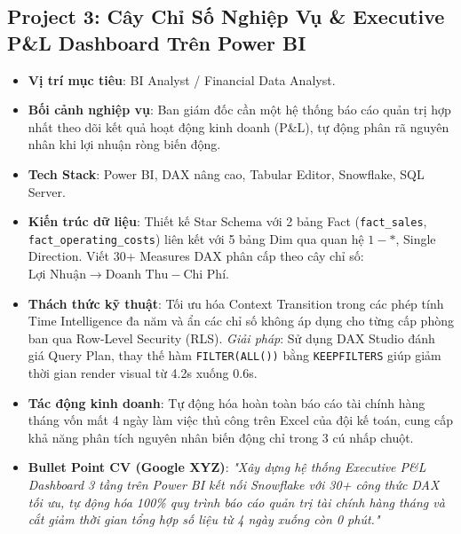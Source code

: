 \subsection{Project 3: Cây Chỉ Số Nghiệp Vụ \& Executive P\&L Dashboard Trên Power BI}
\begin{itemize}
    \item \textbf{Vị trí mục tiêu}: BI Analyst / Financial Data Analyst.
    \item \textbf{Bối cảnh nghiệp vụ}: Ban giám đốc cần một hệ thống báo cáo quản trị hợp nhất theo dõi kết quả hoạt động kinh doanh (P\&L), tự động phân rã nguyên nhân khi lợi nhuận ròng biến động.
    \item \textbf{Tech Stack}: Power BI, DAX nâng cao, Tabular Editor, Snowflake, SQL Server.
    \item \textbf{Kiến trúc dữ liệu}: Thiết kế Star Schema với 2 bảng Fact (\texttt{fact\_sales}, \texttt{fact\_operating\_costs}) liên kết với 5 bảng Dim qua quan hệ $1-*$, Single Direction. Viết 30+ Measures DAX phân cấp theo cây chỉ số: $\text{Lợi Nhuận} \rightarrow \text{Doanh Thu} - \text{Chi Phí}$.
    \item \textbf{Thách thức kỹ thuật}: Tối ưu hóa Context Transition trong các phép tính Time Intelligence đa năm và ẩn các chỉ số không áp dụng cho từng cấp phòng ban qua Row-Level Security (RLS). \textit{Giải pháp}: Sử dụng DAX Studio đánh giá Query Plan, thay thế hàm \texttt{FILTER(ALL())} bằng \texttt{KEEPFILTERS} giúp giảm thời gian render visual từ 4.2s xuống 0.6s.
    \item \textbf{Tác động kinh doanh}: Tự động hóa hoàn toàn báo cáo tài chính hàng tháng vốn mất 4 ngày làm việc thủ công trên Excel của đội kế toán, cung cấp khả năng phân tích nguyên nhân biến động chỉ trong 3 cú nhấp chuột.
    \item \textbf{Bullet Point CV (Google XYZ)}: \textit{"Xây dựng hệ thống Executive P\&L Dashboard 3 tầng trên Power BI kết nối Snowflake với 30+ công thức DAX tối ưu, tự động hóa 100\% quy trình báo cáo quản trị tài chính hàng tháng và cắt giảm thời gian tổng hợp số liệu từ 4 ngày xuống còn 0 phút."}
\end{itemize}

